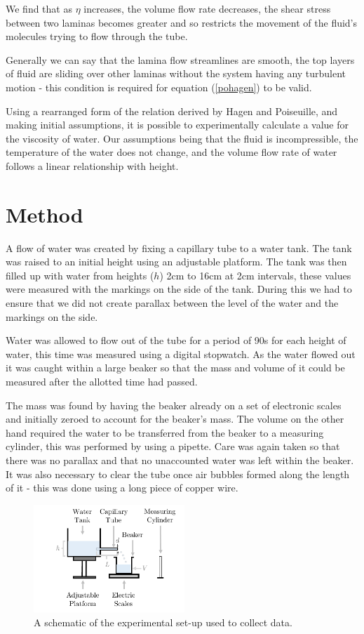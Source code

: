 \documentclass[twocolumn]{revtex4}
\begin{document}
We find that as $\eta$ increases, the volume flow rate decreases, the shear stress between two laminas becomes greater and so restricts the movement of the fluid's molecules trying to flow through the tube. 

Generally we can say that the lamina flow streamlines are smooth, the top layers of fluid are sliding over other laminas without the system having any turbulent motion - this condition is required for equation (\ref{pohagen}) to be valid. 

Using a rearranged form of the relation derived by Hagen and Poiseuille, and making initial assumptions, it is possible to experimentally calculate a value for the viscosity of water. Our assumptions being that the fluid is incompressible, the temperature of the water does not change, and the volume flow rate of water follows a linear relationship with height.

\vspace{-3ex}
\section{Method} 
\vspace{-2ex}
A flow of water was created by fixing a capillary tube to a water tank. The tank was raised to an initial height using an adjustable platform. The tank was then filled up with water from heights ($h$) 2cm to 16cm at 2cm intervals, these values were measured with the markings on the side of the tank. During this we had to ensure that we did not create parallax between the level of the water and the markings on the side. 

Water was allowed to flow out of the tube for a period of 90s for each height of water, this time was measured using a digital stopwatch. As the water flowed out it was caught within a large beaker so that the mass and volume of it could be measured after the allotted time had passed. 

The mass was found by having the beaker already on a set of electronic scales and initially zeroed to account for the beaker's mass. The volume on the other hand required the water to be transferred from the beaker to a measuring cylinder, this was performed by using a pipette. Care was again taken so that there was no parallax and that no unaccounted water was left within the beaker. It was also necessary to clear the tube once air bubbles formed along the length of it - this was done using a long piece of copper wire. 

\begin{figure}[!h]
\begin{center}
\includegraphics[width=5.7cm]{fig1}
\caption[]{A schematic of the experimental set-up used to collect data. }
\label{fig:fig1}
\end{center}
\end{figure}
\end{document}
